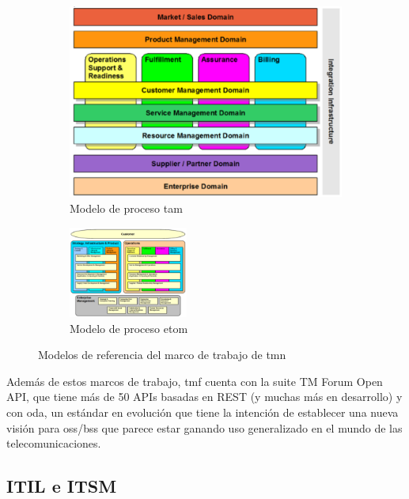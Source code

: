 \begin{figure}
  \begin{subfigure}[c]{0.4\textwidth}
    \includegraphics[width=\textwidth]{imaxes/tam.png}
    \caption{Modelo de proceso \acrshort{tam}}
    \label{fig:tam}
  \end{subfigure}
  \hfil
  \begin{subfigure}[c]{0.55\textwidth}
    \includegraphics[width=\textwidth,height=3cm]{imaxes/etom.png}
    \caption{Modelo de proceso \acrshort{etom}}
    \label{fig:etom}
  \end{subfigure}
  \caption{Modelos de referencia del marco de trabajo de \acrshort{tmn}}
  \label{fig:tam-etom}
\end{figure}


Además de estos marcos de trabajo, \acrshort{tmf} cuenta con la suite TM Forum Open API, que tiene más de 50 APIs basadas en REST (y muchas más en desarrollo) y con \acrfull{oda}, un estándar en evolución que tiene la intención de establecer una nueva visión para \acrshort{oss}/\acrshort{bss} que parece estar ganando uso generalizado en el mundo de las telecomunicaciones.


\subsection{ITIL e ITSM}

